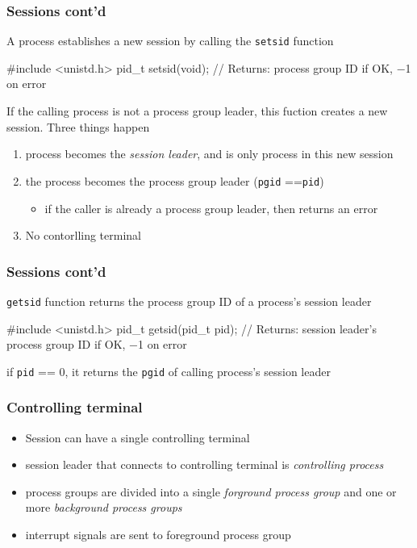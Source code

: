 \documentclass[newPxFont,sthlmFooter,nooffset]{beamer}
\begin{document}
\begin{frame}[fragile,t]
  \frametitle{Sessions cont'd}

A process establishes a new session by calling the \texttt{setsid} function
\begin{codedef}
#include <unistd.h>
pid_t setsid(void);
// Returns: process group ID if OK, −1 on error    
\end{codedef}

If the calling process is not a process group leader, this fuction creates a new session. Three things happen
\begin{enumerate}
\item <2-> process becomes the \textit{session leader}, and is only process in this new session
\item <3-> the process becomes the process group leader (\texttt{pgid} ==\texttt{pid})
  \begin{itemize}
  \item if the caller is already a process group leader, then returns an error
  \end{itemize}
\item <4-> No contorlling terminal
\end{enumerate}

\end{frame}


\begin{frame}[fragile,t]
  \frametitle{Sessions cont'd}
\texttt{getsid} function returns the process group ID of a process's session leader

\begin{codedef}
#include <unistd.h> 
pid_t getsid(pid_t pid);
// Returns: session leader’s process group ID if OK, −1 on error  
\end{codedef}

if \texttt{pid} == 0, it returns the \texttt{pgid} of calling process's session leader
\end{frame}



\begin{frame}[t]
  \frametitle{Controlling terminal}
\begin{itemize}
\item Session can have a single controlling terminal
\item session leader that connects to controlling terminal is \textit{controlling process}
\item process groups are divided into a single \textit{forground process group} and one or more \textit{background process groups}
\item interrupt signals are sent to foreground process group
\end{itemize}
\end{frame}
\end{document}
